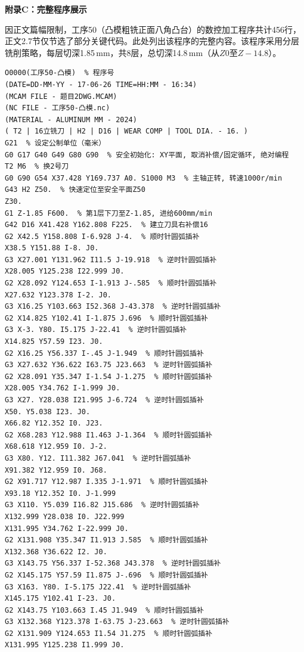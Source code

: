\documentclass{xautCADreport}
\begin{document}
{\centering\LARGE\bfseries 附录C：完整程序展示\par\vspace{0.8em}}

因正文篇幅限制，工序50（凸模粗铣正面八角凸台）的数控加工程序共计456行，正文2.7节仅节选了部分关键代码。此处列出该程序的完整内容。该程序采用分层铣削策略，每层切深1.85\,mm，共8层，总切深14.8\,mm（从$Z0$至$Z-14.8$）。

\begin{lstlisting}[language={}, title={工序50-凸模.nc（完整程序）}, basicstyle=\ttfamily\tiny]
%
O0000(工序50-凸模)  % 程序号
(DATE=DD-MM-YY - 17-06-26 TIME=HH:MM - 16:34)
(MCAM FILE - 题目2DWG.MCAM)
(NC FILE - 工序50-凸模.nc)
(MATERIAL - ALUMINUM MM - 2024)
( T2 | 16立铣刀 | H2 | D16 | WEAR COMP | TOOL DIA. - 16. )
G21  % 设定公制单位（毫米）
G0 G17 G40 G49 G80 G90  % 安全初始化: XY平面, 取消补偿/固定循环, 绝对编程
T2 M6  % 换2号刀
G0 G90 G54 X37.428 Y169.737 A0. S1000 M3  % 主轴正转, 转速1000r/min
G43 H2 Z50.  % 快速定位至安全平面Z50
Z30.
G1 Z-1.85 F600.  % 第1层下刀至Z-1.85, 进给600mm/min
G42 D16 X41.428 Y162.808 F225.  % 建立刀具右补偿16
G2 X42.5 Y158.808 I-6.928 J-4.  % 顺时针圆弧插补
X38.5 Y151.88 I-8. J0.
G3 X27.001 Y131.962 I11.5 J-19.918  % 逆时针圆弧插补
X28.005 Y125.238 I22.999 J0.
G2 X28.092 Y124.653 I-1.913 J-.585  % 顺时针圆弧插补
X27.632 Y123.378 I-2. J0.
G3 X16.25 Y103.663 I52.368 J-43.378  % 逆时针圆弧插补
G2 X14.825 Y102.41 I-1.875 J.696  % 顺时针圆弧插补
G3 X-3. Y80. I5.175 J-22.41  % 逆时针圆弧插补
X14.825 Y57.59 I23. J0.
G2 X16.25 Y56.337 I-.45 J-1.949  % 顺时针圆弧插补
G3 X27.632 Y36.622 I63.75 J23.663  % 逆时针圆弧插补
G2 X28.091 Y35.347 I-1.54 J-1.275  % 顺时针圆弧插补
X28.005 Y34.762 I-1.999 J0.
G3 X27. Y28.038 I21.995 J-6.724  % 逆时针圆弧插补
X50. Y5.038 I23. J0.
X66.82 Y12.352 I0. J23.
G2 X68.283 Y12.988 I1.463 J-1.364  % 顺时针圆弧插补
X68.618 Y12.959 I0. J-2.
G3 X80. Y12. I11.382 J67.041  % 逆时针圆弧插补
X91.382 Y12.959 I0. J68.
G2 X91.717 Y12.987 I.335 J-1.971  % 顺时针圆弧插补
X93.18 Y12.352 I0. J-1.999
G3 X110. Y5.039 I16.82 J15.686  % 逆时针圆弧插补
X132.999 Y28.038 I0. J22.999
X131.995 Y34.762 I-22.999 J0.
G2 X131.908 Y35.347 I1.913 J.585  % 顺时针圆弧插补
X132.368 Y36.622 I2. J0.
G3 X143.75 Y56.337 I-52.368 J43.378  % 逆时针圆弧插补
G2 X145.175 Y57.59 I1.875 J-.696  % 顺时针圆弧插补
G3 X163. Y80. I-5.175 J22.41  % 逆时针圆弧插补
X145.175 Y102.41 I-23. J0.
G2 X143.75 Y103.663 I.45 J1.949  % 顺时针圆弧插补
G3 X132.368 Y123.378 I-63.75 J-23.663  % 逆时针圆弧插补
G2 X131.909 Y124.653 I1.54 J1.275  % 顺时针圆弧插补
X131.995 Y125.238 I1.999 J0.

\end{lstlisting}
\end{document}
